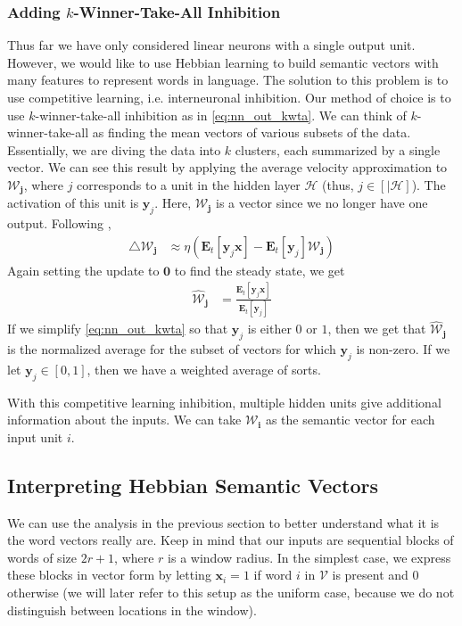 \documentclass[12pt, usenames]{article}
\theoremstyle{definition}
\theoremstyle{definition}
\theoremstyle{definition}
\newcommand{\E}[2]
{\textbf{E}_{#1}\left[{#2}\right]}
\newcommand{\mc}[1]
{\mathcal{#1}}
\newcommand{\vv}[1]
{\textbf{#1}}
\begin{document}
\subsubsection{Adding $k$-Winner-Take-All Inhibition}
Thus far we have only considered linear neurons with a single output unit. However, we would like to use Hebbian learning to build semantic vectors with many features to represent words in language. The solution to this problem is to use competitive learning, i.e. interneuronal inhibition. Our method of choice is to use $k$-winner-take-all inhibition as in \autoref{eq:nn_out_kwta}. We can think of $k$-winner-take-all as finding the mean vectors of various subsets of the data. Essentially, we are diving the data into $k$ clusters, each summarized by a single vector. We can see this result by applying the average velocity approximation to $\mc{W}_{\vv{j}}$, where $j$ corresponds to a unit in the hidden layer $\mc{H}$ (thus, $j \in [|\mc{H}]$). The activation of this unit is $\vv{y}_j$. Here, $\mc{W}_{\vv{j}}$ is a vector since we no longer have one output. Following \cite{Seung}, 
\begin{align}
\triangle \mc{W}_{\vv{j}} &\approx \eta\left(\E{t}{\vv{y}_j\vv{x}} - \E{t}{\vv{y}_j}\mc{W}_{\vv{j}}\right)
\end{align}
Again setting the update to $\vv{0}$ to find the steady state, we get
\begin{align}
\label{eq:wv_meaning}
\hat{\mc{W}}_{\vv{j}} &= \frac{\E{t}{\vv{y}_j\vv{x}}}{\E{t}{\vv{y}_j}}
\end{align}
If we simplify \autoref{eq:nn_out_kwta} so that $\vv{y}_j$ is either $0$ or $1$, then we get that $\hat{\mc{W}}_{\vv{j}}$ is the normalized average for the subset of vectors for which $\vv{y}_j$ is non-zero. If we let $\vv{y}_j \in [0, 1]$, then we have a weighted average of sorts. 

With this competitive learning inhibition, multiple hidden units give additional information about the inputs. We can take $\mc{W}_{\vv{i}}$ as the semantic vector for each input unit $i$. 

\subsection{Interpreting Hebbian Semantic Vectors}

We can use the analysis in the previous section to better understand what it is the word vectors really are. Keep in mind that our inputs are sequential blocks of words of size $2r + 1$, where $r$ is a window radius. In the simplest case, we express these blocks in vector form by letting $\vv{x}_i = 1$ if word $i$ in $\mc{V}$ is present and $0$ otherwise (we will later refer to this setup as the uniform case, because we do not distinguish between locations in the window). 
\end{document}

